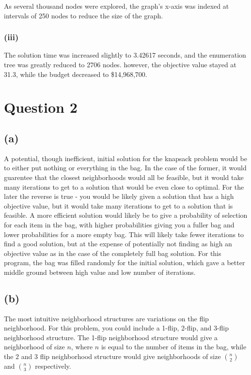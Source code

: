 \documentclass[12pt, letterpaper]{article}
\begin{document}
As several thousand nodes were explored, the graph's x-axis was indexed at intervals of 250 nodes to reduce the size of the graph.

\subsubsection*{(iii)}

The solution time was increased slightly to 3.42617 seconds, and the enumeration tree was greatly reduced to 2706 nodes. however, the objective value stayed at 31.3, while the budget decreased to \$14,968,700.

\section*{Question 2}

\subsection*{(a)}
A potential, though inefficient, initial solution for the knapsack problem would be to either put nothing or everything in the bag. In the case of the former, it would guarentee that the closest neighborhoods would all be feasible, but it would take many iterations to get to a solution that would be even close to optimal. For the later the reverse is true - you would be likely given a solution that has a high objective value, but it would take many iterations to get to a solution that is feasible. A more efficient solution would likely be to give a probability of selection for each item in the bag, with higher probabilities giving you a fuller bag and lower probabilities for a more empty bag. This will likely take fewer iterations to find a good solution, but at the expense of potentially not finding as high an objective value as in the case of the completely full bag solution. For this program, the bag was filled randomly for the initial solution, which gave a better middle ground between high value and low number of iterations.

\subsection*{(b)}
The most intuitive neighborhood structures are variations on the flip neighborhood. For this problem, you could include a 1-flip, 2-flip, and 3-flip neighborhood structure. The 1-flip neighborhood structure would give a neighborhood of size $n$, where $n$ is equal to the number of items in the bag, while the 2 and 3 flip neighborhood structure would give neighborhoods of size ${n \choose 2}$ and ${n \choose 3}$ respectively.
\end{document}
